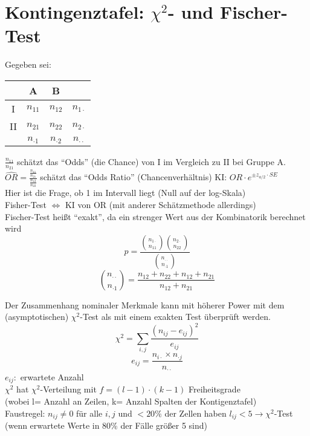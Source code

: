 \section{Kontingenztafel: $\chi^2$- und Fischer-Test}
Gegeben sei:
\begin{tabular}{c|c|c|c}
	& A & B \\ \hline
	I & $n_{11}$ & $n_{12}$ & $n_{1\cdot}$ \\ \hline
	II & $n_{21}$ & $n_{22}$ & $n_{2\cdot}$ \\ \hline
	& $n_{\cdot1}$ & $n_{\cdot2}$ & $n_{\cdot\cdot}$
\end{tabular}
\newline
$\frac{n_{11}}{n_{21}}$ schätzt das ``Odds'' (die Chance) von I im Vergleich zu II bei Gruppe A. \\
$\widehat{OR}=\frac{\frac{n_{11}}{n_{21}}}{\frac{n_{12}}{n_{22}}}$ schätzt das ``Odds Ratio'' (Chancenverhältnis) KI: $OR \cdot e^{\pm z_{a/2} \cdot SE}$ \\
Hier ist die Frage, ob 1 im Intervall liegt (Null auf der log-Skala)\\
Fisher-Test $\Leftrightarrow$ KI von OR (mit anderer Schätzmethode allerdings)  \\
Fischer-Test heißt ``exakt'', da ein strenger Wert aus der Kombinatorik berechnet wird
\[ p = \frac{\binom{n_{1\cdot}}{n_{11}} \binom{n_{2\cdot}}{n_{22}}}{ \binom{n_{\cdot \cdot}}{n_{\cdot1}}} \]
\[ \binom{n_{\cdot\cdot}}{n_{\cdot1}} = \frac{n_{12} + n_{22} + n_{12} + n_{21} }{n_{12} + n_{21} } \]

Der Zusammenhang nominaler Merkmale kann mit höherer Power mit dem (asymptotischen) $\chi^2$-Test als mit einem exakten Test überprüft werden.
\[ \chi^2 = \sum\limits_{i,j} \frac{(n_{ij} - e_{ij})^2}{e_{ij}} \]
\[ e_{ij}= \frac{n_{i\cdot} \times n_{\cdot j}}{n_{\cdot \cdot}} \]
$e_{ij}:$ erwartete Anzahl \\
$\chi^2$ hat $\chi^2$-Verteilung mit $f=(l-1)\cdot(k-1)$ Freiheitsgrade  \\
(wobei l= Anzahl an Zeilen, k= Anzahl Spalten der Kontigenztafel) \\
Faustregel: $n_{ij} \neq 0$ für alle $i,j$ und $< 20 \%$ der Zellen haben $l_{ij} < 5 \rightarrow \chi^2$-Test (wenn erwartete Werte in 80\% der Fälle größer 5 sind)\\

